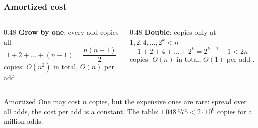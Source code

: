 \documentclass[aspectratio=169,10pt,compress]{beamer}
\begin{document}
\begin{frame}[t,fragile] \frametitle{Amortized cost}
	\begin{columns}[T]
		\begin{column}{0.48\textwidth}
			\textbf{Grow by one}: every add copies all
			\[
				1 + 2 + \dots + (n - 1) = \frac{n (n - 1)}{2}
			\]
			copies: $O(n^{2})$ in total, $O(n)$ per add.
		\end{column}
		\begin{column}{0.48\textwidth}
			\textbf{Double}: copies only at $1, 2, 4, \dots, 2^{k} < n$
			\[
				1 + 2 + 4 + \dots + 2^{k} = 2^{k + 1} - 1 < 2 n
			\]
			copies: $O(n)$ in total, $O(1)$ per add .
		\end{column}
	\end{columns}

	\vspace{1em}
	\begin{block}{Amortized}
		One  may cost $n$ copies, but the expensive ones are rare: spread over all adds,
		the cost per add is a constant. The table: $1\,048\,575 < 2 \cdot 10^{6}$ copies for a million adds.
	\end{block}
\end{frame}




\end{document}

